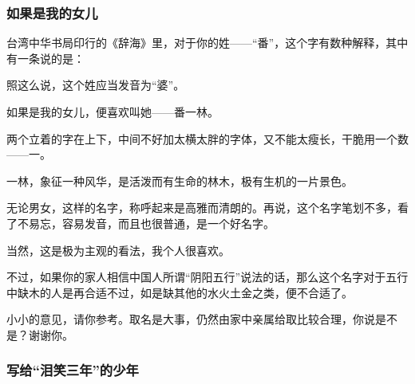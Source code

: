 \subsubsection{如果是我的女儿}


\par {}
\par 台湾中华书局印行的《辞海》里，对于你的姓——“番”，这个字有数种解释，其中有一条说的是：
\par 照这么说，这个姓应当发音为“婆”。
\par 如果是我的女儿，便喜欢叫她——番一林。
\par 两个立着的字在上下，中间不好加太横太胖的字体，又不能太瘦长，干脆用一个数——一。
\par 一林，象征一种风华，是活泼而有生命的林木，极有生机的一片景色。
\par 无论男女，这样的名字，称呼起来是高雅而清朗的。再说，这个名字笔划不多，看了不易忘，容易发音，而且也很普通，是一个好名字。
\par 当然，这是极为主观的看法，我个人很喜欢。
\par 不过，如果你的家人相信中国人所谓“阴阳五行”说法的话，那么这个名字对于五行中缺木的人是再合适不过，如是缺其他的水火土金之类，便不合适了。
\par 小小的意见，请你参考。取名是大事，仍然由家中亲属给取比较合理，你说是不是？谢谢你。
\par {}


\subsubsection{写给“泪笑三年”的少年}

